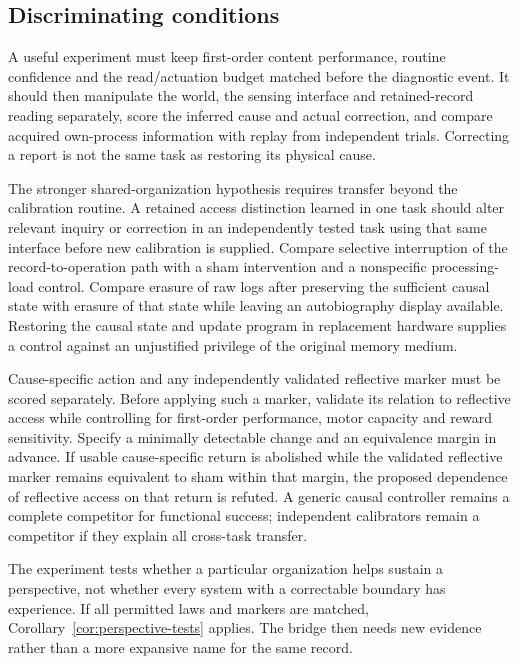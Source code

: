 \documentclass[12pt]{article}
\theoremstyle{definition}
\theoremstyle{remark}
\begin{document}
\subsection{Discriminating conditions}

A useful experiment must keep first-order content performance,
routine confidence and the read/actuation budget matched before the
diagnostic event. It should then manipulate the world, the sensing
interface and retained-record reading separately, score the inferred
cause and actual correction, and compare acquired own-process
information with replay from independent trials. Correcting a report
is not the same task as restoring its physical cause.

The stronger shared-organization hypothesis requires transfer beyond
the calibration routine. A retained access distinction learned in one
task should alter relevant inquiry or correction in an independently
tested task using that same interface before new calibration is
supplied. Compare selective interruption of the record-to-operation
path with a sham intervention and a nonspecific processing-load
control. Compare erasure of raw logs after preserving the sufficient
causal state with erasure of that state while leaving an autobiography
display available. Restoring the causal state and update program in
replacement hardware supplies a control against an unjustified
privilege of the original memory medium.

Cause-specific action and any independently validated reflective
marker must be scored separately. Before applying such a marker,
validate its relation to reflective access while controlling for
first-order performance, motor capacity and reward sensitivity.
Specify a minimally detectable change and an equivalence margin in
advance. If usable cause-specific return is abolished while the
validated reflective marker remains equivalent to sham within that
margin, the proposed dependence of reflective access on that return
is refuted. A generic causal controller remains a complete
competitor for functional success; independent calibrators remain
a competitor if they explain all cross-task transfer.

The experiment tests whether a particular organization helps sustain
a perspective, not whether every system with a correctable boundary
has experience. If all permitted laws and markers are matched,
Corollary~\ref{cor:perspective-tests} applies. The bridge then needs
new evidence rather than a more expansive name for the same record.
\end{document}
